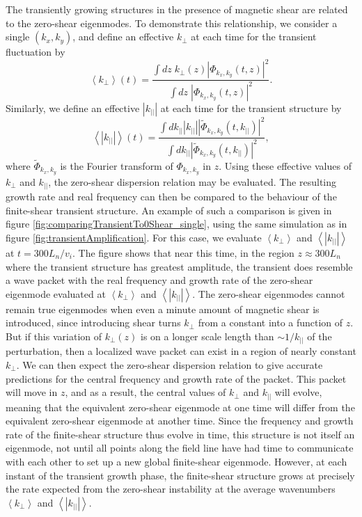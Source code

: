 \documentclass{jpp}
\begin{document}
The transiently growing structures in the presence of magnetic shear
are related to the zero-shear eigenmodes.  To demonstrate this relationship, we consider a single
$(k_x,k_y)$, and define an effective
$k_{\perp}$ at each time for the transient fluctuation by
\begin{equation}
\label{eq:expectedKperp}
\left< k_{\perp} \right>(t) = 
\frac{\int dz\; k_{\perp}(z) \left| \Phi_{k_x,k_y}(t,z)\right|^2}
{\int dz\; \left| \Phi_{k_x,k_y}(t,z)\right|^2}.
\end{equation}
Similarly, we define an effective $|k_{||}|$ at each time for the transient structure
by
\begin{equation}
\label{eq:expectedKpar}
\left< \left| k_{||} \right| \right>(t) = \frac{\int dk_{||}  \left| k_{||}\right| \left| \tilde\Phi_{k_x,k_y}(t,k_{||})\right|^2}
{\int dk_{||}\left| \tilde\Phi_{k_x,k_y}(t,k_{||})\right|^2},
\end{equation}
where $\tilde\Phi_{k_x,k_y}$ is the Fourier transform of $\Phi_{k_x,k_y}$ in $z$. Using these effective values
of $k_{\perp}$ and $k_{||}$, the zero-shear dispersion relation may be evaluated.
The resulting growth rate 
and real frequency can then be compared to the behaviour of the finite-shear
transient structure.
An example of such a comparison is given in figure \ref{fig:comparingTransientTo0Shear_single},
using the same simulation as in figure \ref{fig:transientAmplification}.
For this case, we evaluate $\left< k_{\perp}\right>$ and $\left<|k_{||}|\right>$
at $t = 300 L_n/v_i$.
The figure shows that near this time, in the region $z \approx 300 L_n$ where the transient structure has greatest
amplitude, the transient does resemble a wave packet with the real frequency and growth rate
of the zero-shear eigenmode evaluated at $\left< k_{\perp}\right>$ and $\left<|k_{||}|\right>$.
The zero-shear eigenmodes cannot remain true eigenmodes when even a minute amount of magnetic shear
is introduced, since introducing shear turns $k_{\perp}$ from a constant into a function of $z$.
But if this variation of $k_{\perp}(z)$ is on a longer scale length than $\sim 1/k_{||}$ of the perturbation, 
then a localized wave packet can exist in a region of nearly constant $k_{\perp}$.
We can then expect the zero-shear dispersion relation to give accurate predictions for the central frequency
and growth rate of the packet. This packet will move in $z$, and as a result, the central values of $k_{\perp}$
and $k_{||}$ will evolve, meaning that the equivalent zero-shear eigenmode at one time
will differ from the equivalent zero-shear eigenmode at another time. 
Since the frequency and growth rate of the finite-shear structure thus evolve in time, this structure is not
itself an eigenmode, not until all points along the field line have had time to communicate with each other
to set up a new global finite-shear eigenmode.
However, at each instant of the transient growth phase, the finite-shear structure grows at precisely the rate expected from the zero-shear
instability at the average wavenumbers $\left< k_{\perp} \right>$ and $\left< \left| k_{||} \right| \right>$.
\end{document}
